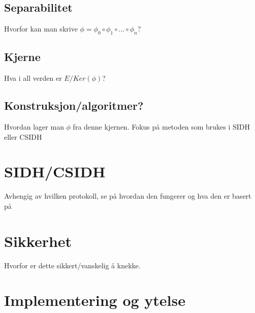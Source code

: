 \documentclass{article}
\begin{document}
\subsection{Separabilitet}
Hvorfor kan man skrive $\phi = \phi_0 \circ \phi_1 \circ \ldots \circ \phi_n$?
\subsection{Kjerne}
Hva i all verden er $E/Ker(\phi)$?
\subsection{Konstruksjon/algoritmer?}
Hvordan lager man $\phi$ fra denne kjernen. Fokus på metoden som brukes i SIDH eller CSIDH
\section{SIDH/CSIDH}
Avhengig av hvilken protokoll, se på hvordan den fungerer og hva den er basert på
\section{Sikkerhet}
Hvorfor er dette sikkert/vanskelig å knekke.
\section{Implementering og ytelse}
\end{document}
